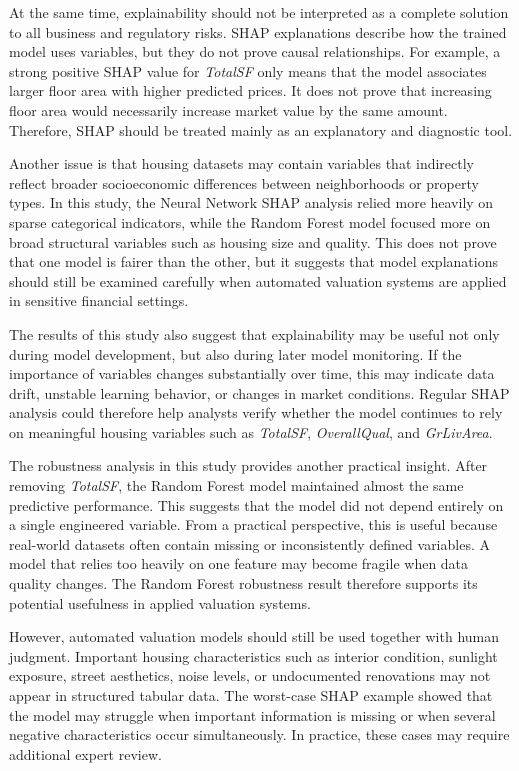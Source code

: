 \documentclass[12pt,a4paper,oneside,openany]{book}
\begin{document}
At the same time, explainability should not be interpreted as a complete solution to all business and regulatory risks. SHAP explanations describe how the trained model uses variables, but they do not prove causal relationships. For example, a strong positive SHAP value for \textit{TotalSF} only means that the model associates larger floor area with higher predicted prices. It does not prove that increasing floor area would necessarily increase market value by the same amount. Therefore, SHAP should be treated mainly as an explanatory and diagnostic tool.

Another issue is that housing datasets may contain variables that indirectly reflect broader socioeconomic differences between neighborhoods or property types. In this study, the Neural Network SHAP analysis relied more heavily on sparse categorical indicators, while the Random Forest model focused more on broad structural variables such as housing size and quality. This does not prove that one model is fairer than the other, but it suggests that model explanations should still be examined carefully when automated valuation systems are applied in sensitive financial settings.

The results of this study also suggest that explainability may be useful not only during model development, but also during later model monitoring. If the importance of variables changes substantially over time, this may indicate data drift, unstable learning behavior, or changes in market conditions. Regular SHAP analysis could therefore help analysts verify whether the model continues to rely on meaningful housing variables such as \textit{TotalSF}, \textit{OverallQual}, and \textit{GrLivArea}.

The robustness analysis in this study provides another practical insight. After removing \textit{TotalSF}, the Random Forest model maintained almost the same predictive performance. This suggests that the model did not depend entirely on a single engineered variable. From a practical perspective, this is useful because real-world datasets often contain missing or inconsistently defined variables. A model that relies too heavily on one feature may become fragile when data quality changes. The Random Forest robustness result therefore supports its potential usefulness in applied valuation systems.

However, automated valuation models should still be used together with human judgment. Important housing characteristics such as interior condition, sunlight exposure, street aesthetics, noise levels, or undocumented renovations may not appear in structured tabular data. The worst-case SHAP example showed that the model may struggle when important information is missing or when several negative characteristics occur simultaneously. In practice, these cases may require additional expert review.
\end{document}

